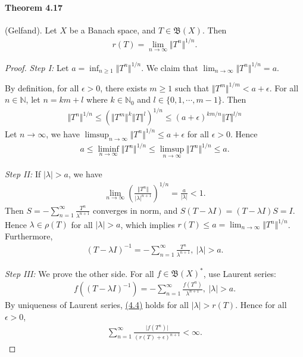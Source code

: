 \documentclass{article}
\begin{document}
\paragraph{Theorem 4.17\label{thm:4.17}} (Gelfand). Let $X$ be a Banach space, and $T\in\mathfrak{B}(X)$. Then
\begin{align*}
	r(T) = \lim_{n\to\infty}\Vert T^n\Vert^{1/n}.
\end{align*}
\begin{proof}
\textit{Step I:} Let $a=\inf_{n\geq 1}\Vert T^n\Vert^{1/n}$. We claim that $\lim_{n\to\infty}\Vert T^n\Vert^{1/n}=a$.

By definition, for all $\epsilon>0$, there exists $m\geq 1$ such that $\Vert T^m\Vert^{1/m}<a+\epsilon$. For all $n\in\mathbb{N}$, let $n=km+l$ where $k\in\mathbb{N}_0$ and $l\in\{0,1,\cdots,m-1\}$. Then
\begin{align*}
	\Vert T^n\Vert^{1/n}\leq\left(\Vert T^m\Vert^k\left\Vert T\right\Vert^l\right)^{1/n}\leq(a+\epsilon)^{km/n}\Vert T\Vert^{l/n}
\end{align*}
Let $n\to\infty$, we have $\limsup_{n\to\infty}\Vert T^n\Vert^{1/n}\leq a+\epsilon$ for all $\epsilon>0$. Hence
\begin{align*}
	a\leq\liminf_{n\to\infty}\Vert T^n\Vert^{1/n}\leq\limsup_{n\to\infty}\Vert T^n\Vert^{1/n}\leq a.
\end{align*}

\textit{Step II:} If $\vert\lambda\vert > a$, we have
\begin{align*}
	\lim_{n\to\infty}\left(\frac{\Vert T^n\Vert}{\vert\lambda\vert^{n+1}}\right)^{1/n} = \frac{a}{\vert\lambda\vert} < 1.
\end{align*}
Then $S=-\sum_{n=1}^\infty\frac{T^n}{\lambda^{n+1}}$ converges in norm, and $S(T-\lambda I)=(T-\lambda I)S= I$. Hence $\lambda\in\rho(T)$ for all $\vert\lambda\vert > a$, which implies $r(T)\leq a=\lim_{n\to\infty}\Vert T^n\Vert^{1/n}$. Furthermore,
\begin{align*}
	(T-\lambda I)^{-1}=-\sum_{n=1}^\infty\frac{T^n}{\lambda^{n+1}},\ \vert\lambda\vert > a.
\end{align*}

\textit{Step III:} We prove the other side. For all $f\in\mathfrak{B}(X)^*$, use Laurent series:
\begin{align*}
	f\left((T-\lambda I)^{-1}\right) = -\sum_{n=1}^\infty\frac{f(T^n)}{\lambda^{n+1}},\ \vert\lambda\vert > a. \tag{4.4}\label{eq:4.4}
\end{align*}
By uniqueness of Laurent series, \hyperref[eq:4.4]{(4.4)} holds for all $\vert\lambda\vert > r(T)$. Hence for all $\epsilon>0$,
\begin{align*}
	\sum_{n=1}^\infty\frac{\vert f(T^n)\vert}{\left(r(T)+\epsilon\right)^{n+1}} < \infty.
\end{align*}


\end{proof}
\end{document}
